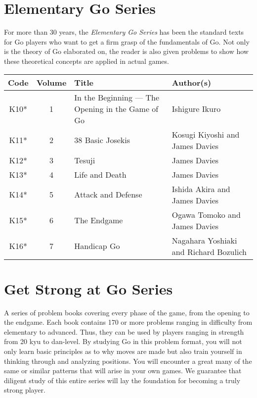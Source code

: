 \section{Elementary Go Series}

For more than 30 years, the \emph{Elementary Go Series} has been the standard texts for Go players who want to get a firm grasp of the fundamentals of Go. Not only is the theory of Go elaborated on, the reader is also given problems to show how these theoretical concepts are applied in actual games.

\begin{longtable}{c|c|p{45mm}|p{45mm}} 
    \hline
    \textbf{Code} & \textbf{Volume} & \textbf{Title} &\textbf{Author(s)} \\
    \hline \hline
    K10* & 1 & In the Beginning --- The Opening in the Game of Go & Ishigure Ikuro \\
    \hline
    K11* & 2 & 38 Basic Josekis & Kosugi Kiyoshi and James Davies \\
    \hline
    K12* & 3 & Tesuji & James Davies \\
    \hline
    K13* & 4 & Life and Death & James Davies \\
    \hline
    K14* & 5 & Attack and Defense & Ishida Akira and James Davies \\
    \hline
    K15* & 6 & The Endgame & Ogawa Tomoko and James Davies \\
    \hline
    K16* & 7 & Handicap Go & Nagahara Yoshiaki and Richard Bozulich \\
    \hline
\end{longtable}

\section{Get Strong at Go Series}

A series of problem books covering every phase of the game, from the opening to the endgame. Each book contains 170 or more problems ranging in difficulty from elementary to advanced. Thus, they can be used by players ranging in strength from 20 kyu to dan-level. By studying Go in this problem format, you will not only learn basic principles as to why moves are made but also train yourself in thinking through and analyzing positions. You will encounter a great many of the same or similar patterns that will arise in your own games. We guarantee that diligent study of this entire series will lay the foundation for becoming a truly strong player.

